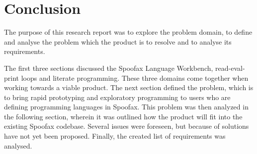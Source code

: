 \section{Conclusion}
\label{sec:conclusion}

The purpose of this research report was to explore the problem domain, to define
and analyse the problem which the product is to resolve and to analyse its
requirements.

The first three sections discussed the Spoofax Language Workbench,
read-eval-print loops and literate programming. These three domains come
together when working towards a viable product. The next section defined the
problem, which is to bring rapid prototyping and exploratory programming to
users who are defining programming languages in Spoofax. This problem was then
analyzed in the following section, wherein it was outlined how the product will
fit into the existing Spoofax codebase. Several issues were foreseen, but
because of %
solutions have not yet been proposed. Finally, the created list of requirements
was analysed. %

